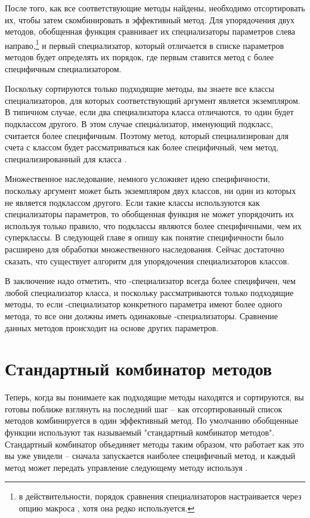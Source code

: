 После того, как все соответствующие методы найдены, необходимо отсортировать их, чтобы
затем скомбинировать в эффективный метод.  Для упорядочения двух методов, обобщенная
функция сравнивает их специализаторы параметров слева направо,\footnote{в
  действительности, порядок сравнения специализаторов настраивается через опцию
   макроса , хотя она редко
  используется.} и первый специализатор, который отличается в списке параметров методов
будет определять их порядок, где первым ставится метод с более специфичным
специализатором.

Поскольку сортируются только подходящие методы, вы знаете все классы специализаторов, для
которых соответствующий аргумент является экземпляром.  В типичном случае, если два
специализатора класса отличаются, то один будет подклассом другого.  В этом случае
специализатор, именующий подкласс, считается более специфичным.  Поэтому метод, который
специализирован для счета с классом  будет рассматриваться как
более специфичный, чем метод, специализированный для класса .

Множественное наследование, немного усложняет идею специфичности, поскольку аргумент может
быть экземпляром двух классов, ни один из которых не является подклассом другого.  Если
такие классы используются как специализаторы параметров, то обобщенная функция не может
упорядочить их используя только правило, что подклассы являются более специфичными, чем их
суперклассы.  В следующей главе я опишу как понятие специфичности было расширено для
обработки множественного наследования.  Сейчас достаточно сказать, что существует алгоритм
для упорядочения специализаторов классов.

В заключение надо отметить, что -специализатор всегда более специфичен, чем
любой специализатор класса, и поскольку рассматриваются только подходящие методы, то если
-специализатор конкретного параметра имеют более одного метода, то все они
должны иметь одинаковые -специализаторы.  Сравнение данных методов происходит на
основе других параметров.

\section{Стандартный комбинатор методов}

Теперь, когда вы понимаете как подходящие методы находятся и сортируются, вы готовы
поближе взглянуть на последний шаг -- как отсортированный список методов комбинируется в
один эффективный метод.  По умолчанию обобщенные функции используют так называемый
"стандартный комбинатор методов".  Стандартный комбинатор объединяет методы таким образом,
что  работает как это вы уже увидели -- сначала запускается
наиболее специфичный метод, и каждый метод может передать управление следующему методу
используя .

